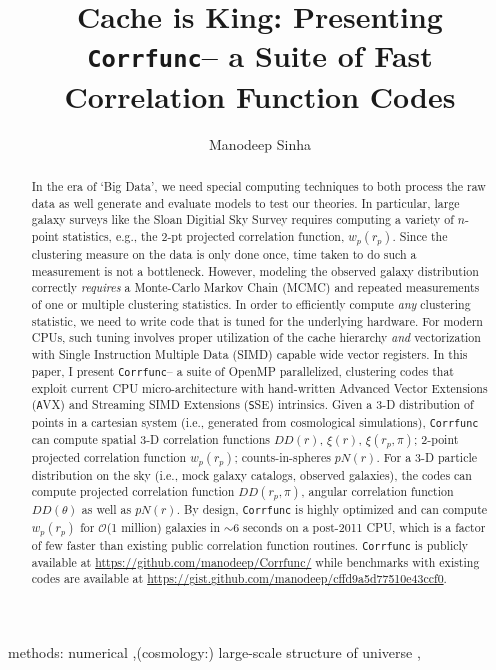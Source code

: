 \documentclass[preprint, 12pt, authoryear]{elsarticle}
\newcommand{\corrfunc}{{\tt Corrfunc}\xspace}
\newcommand{\xir}{\ensuremath{{DD(r)}}\xspace}
\newcommand{\xiofr}{\ensuremath{{\xi(r)}}\xspace}
\newcommand{\wprp}{\ensuremath{{w_p(r_p)}}\xspace}
\newcommand{\xirppi}{\ensuremath{{\xi(r_p,\pi)}}\xspace}
\newcommand{\cis}{\ensuremath{{pN(r)}}\xspace}
\newcommand{\ddrppi}{\ensuremath{{DD(r_p,\pi)}}\xspace}
\newcommand{\wtheta}{\ensuremath{{DD(\theta)}}\xspace}
\newcommand{\avx}{\texttt AVX}
\newcommand{\sse}{\texttt SSE}
\begin{document}
\begin{frontmatter}

\title{Cache is King: Presenting \corrfunc -- a Suite of Fast Correlation Function Codes}

\author[ms]{Manodeep Sinha}
\address[ms]{6902 Stevenson Center, Department of Physics \& Astronomy, Vanderbilt University, Nashville, TN 37235}

\begin{abstract}
In the era of `Big Data', we need special computing techniques to both process the raw data as well 
generate and evaluate models to test our theories. In particular, large galaxy surveys
like the Sloan Digitial Sky Survey requires computing a variety of $n$-point statistics, e.g., the 
2-pt projected correlation function, $\wprp$. 
Since the clustering measure on the data is only done once, time taken to do
such a measurement is not a bottleneck. However, modeling the observed galaxy distribution correctly
{\em requires} a Monte-Carlo Markov Chain (MCMC) and repeated measurements of one or multiple
clustering statistics. In order to efficiently compute {\em any} clustering statistic,
we need to write code that is tuned for the underlying hardware. For
modern CPUs, such tuning involves proper utilization of the cache hierarchy {\em and}
vectorization with Single Instruction Multiple Data (SIMD) capable wide vector registers. 
In this paper, I present \corrfunc --  a suite of OpenMP parallelized, clustering
codes that exploit current CPU micro-architecture with hand-written Advanced
Vector Extensions (\avx) and  Streaming SIMD Extensions (\sse) intrinsics. 
Given a 3-D distribution of points in a cartesian system (i.e.,
generated from cosmological simulations), \corrfunc can compute spatial
3-D correlation functions \xir, \xiofr, \xirppi; 2-point 
projected correlation function \wprp; counts-in-spheres \cis. For a 3-D
particle distribution on the sky (i.e., mock galaxy catalogs, observed galaxies), the codes can compute 
projected correlation function \ddrppi, angular correlation function \wtheta as
well as \cis.  By design, \corrfunc is highly optimized 
and can compute \wprp for $\mathcal{O}$(1 million) galaxies in
$\sim 6$ seconds on a post-2011 CPU, which is a factor of few faster than 
existing public correlation function routines.  \corrfunc is
publicly available at \url{https://github.com/manodeep/Corrfunc/} while
benchmarks with existing codes are available at
\url{https://gist.github.com/manodeep/cffd9a5d77510e43ccf0}.
\end{abstract}

\begin{keyword}
methods: numerical \sep (cosmology:) large-scale structure of universe \sep
\end{keyword}

\end{frontmatter}
\end{document}
